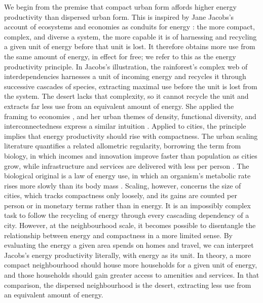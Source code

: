 \documentclass[pdflatex,sn-nature]{sn-jnl}
\begin{document}
We begin from the premise that compact urban form affords higher energy productivity than dispersed urban form. This is inspired by Jane Jacobs's account of ecosystems and economies as conduits for energy \citep{jacobs2000}: the more compact, complex, and diverse a system, the more capable it is of harnessing and recycling a given unit of energy before that unit is lost. It therefore obtains more use from the same amount of energy, in effect for free; we refer to this as the energy productivity principle. In Jacobs's illustration, the rainforest's complex web of interdependencies harnesses a unit of incoming energy and recycles it through successive cascades of species, extracting maximal use before the unit is lost from the system. The desert lacks that complexity, so it cannot recycle the unit and extracts far less use from an equivalent amount of energy. She applied the framing to economies \citep{jacobs1969,jacobs2000}, and her urban themes of density, functional diversity, and interconnectedness express a similar intuition \citep{jacobs1961}. Applied to cities, the principle implies that energy productivity \citep{patterson1996} should rise with compactness. The urban scaling literature quantifies a related allometric regularity, borrowing the term from biology, in which incomes and innovation improve faster than population as cities grow, while infrastructure and services are delivered with less per person \citep{bettencourt2007,glaeser2011}. The biological original is a law of energy use, in which an organism's metabolic rate rises more slowly than its body mass \citep{kleiber1932,west1997}. Scaling, however, concerns the size of cities, which tracks compactness only loosely, and its gains are counted per person or in monetary terms rather than in energy. It is an impossibly complex task to follow the recycling of energy through every cascading dependency of a city. However, at the neighbourhood scale, it becomes possible to disentangle the relationship between energy and compactness in a more limited sense. By evaluating the energy a given area spends on homes and travel, we can interpret Jacobs's energy productivity literally, with energy as its unit. In theory, a more compact neighbourhood should house more households for a given unit of energy, and those households should gain greater access to amenities and services. In that comparison, the dispersed neighbourhood is the desert, extracting less use from an equivalent amount of energy.
\end{document}

